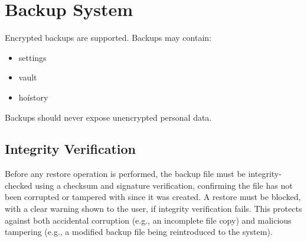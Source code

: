 
\chapter{Backup System}

Encrypted backups are supported. Backups may contain:
\begin{itemize}
	\item settings
	\item vault
	\item hoístory
\end{itemize}
Backups should never expose unencrypted personal data.

\section{Integrity Verification}
Before any restore operation is performed, the backup file must be integrity-checked using a checksum and signature verification, confirming the file has not been corrupted or tampered with since it was created. A restore must be blocked, with a clear warning shown to the user, if integrity verification fails. This protects against both accidental corruption (e.g., an incomplete file copy) and malicious tampering (e.g., a modified backup file being reintroduced to the system).


\sentinelchapterend
